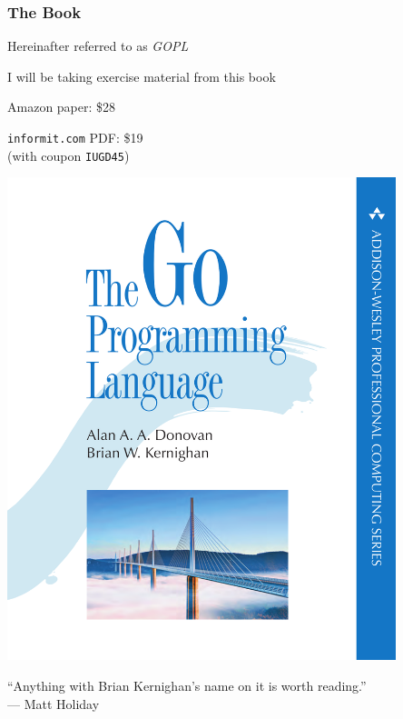 \documentclass[handout,compress,t,11pt]{beamer}
\begin{document}
\begin{frame}[fragile]
    \frametitle{The Book}
    Hereinafter referred to as {\em GOPL} \par
    \vspace{0.4\baselineskip}
    \begin{minipage}[c]{0.55\textwidth}
        I will be taking exercise material 
        from this book \par
        \vspace{\baselineskip}
        
    Amazon paper: \$28 \par
    \vspace{\baselineskip}
    \verb|informit.com| PDF: \$19 \\
    (with coupon \verb|IUGD45|)
    \end{minipage}%
    \begin{minipage}[c]{0.35\textwidth}
        \vspace{0.5\baselineskip}
        \hfill \includegraphics[width=0.85\textwidth,height=.5\textheight]{cover}
    \end{minipage} \par
    \vspace{2\baselineskip}
    ``Anything with Brian Kernighan's name on it is worth reading.'' \\--- Matt Holiday
\end{frame}
\end{document}
